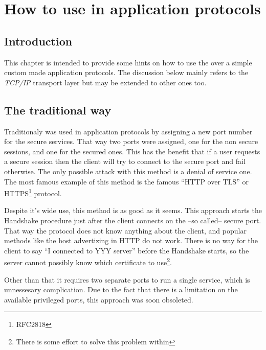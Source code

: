 \chapter{How to use \tls{} in application protocols}
\label{apps}

\section{Introduction}
This chapter is intended to provide some hints on how to use the \tls{}
over a simple custom made application protocols. 
The discussion below mainly refers to the \emph{TCP/IP} transport layer
but may be extended to other ones too.

\section{The traditional way}

Traditionaly \ssl{} was used in application protocols by assigning 
a new port number for the secure services. That way two ports were assigned, one for the
non secure sessions, and one for the secured ones. This has the benefit
that if a user requests a secure session then the client will try to
connect to the secure port and fail otherwise. The only possible attack
with this method is a denial of service one. The most famous
example of this method is the famous ``HTTP over TLS'' or HTTPS\footnote{RFC2818} 
protocol.
\par
Despite it's wide use, this method is as good as it seems.
This approach starts the \tls{} Handshake procedure just after the
client connects on the --so called-- secure port. 
That way the \tls{} protocol does not know anything
about the client, and popular methods like the host advertizing in 
HTTP do not work. There is no way for the client to say ``I connected
to YYY server'' before the Handshake starts, so the server cannot
possibly know which certificate to use\footnote{There is some effort to solve
this problem within \tls{}}.

\par
Other than that it requires two separate ports to run a single service, which is 
unnessesary complication. Due to the fact that there is a limitation on 
the available privileged ports, this approach was soon obsoleted.


